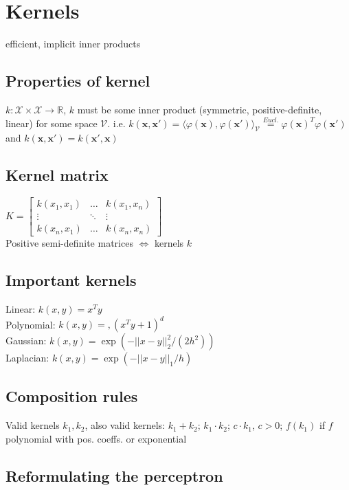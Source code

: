 \section*{Kernels}

efficient, implicit inner products

\subsection*{Properties of kernel}
$k: \mathcal{X} \times \mathcal{X} \rightarrow \mathbb{R}$, $k$ must be some inner product (symmetric, positive-definite, linear) for some space $\mathcal{V}$.
i.e. $k(\mathbf{x}, \mathbf{x'}) = \langle \varphi(\mathbf{x}), \varphi(\mathbf{x'}) \rangle_\mathcal{V} \overset{Eucl.}{=} \varphi(\mathbf{x})^T \varphi(\mathbf{x'}) $
and $k(\mathbf{x}, \mathbf{x}') = k(\mathbf{x}', \mathbf{x})$

\subsection*{Kernel matrix}
$K = 
\begin{bmatrix}
	k(x_1,x_1) & \dots & k(x_1,x_n) \\
	\vdots & \ddots & \vdots \\
	k(x_n, x_1) & \dots & k(x_n,x_n)
\end{bmatrix}$\\
Positive semi-definite matrices $\Leftrightarrow$ kernels $k$

\subsection*{Important kernels}
Linear: $k(x,y)=x^T y$\\
Polynomial: $k(x,y)=,{(x^T y + 1)}^d$\\
Gaussian: $k(x,y) = \exp(-||x-y||_2^2/(2h^2))$\\
Laplacian: $k(x,y) = \exp(-||x-y||_1/h)$

\subsection*{Composition rules}
Valid kernels $k_1, k_2$, also valid kernels:
$k_1 + k_2$; $k_1 \cdot k_2$; $c \cdot k_1$, $c>0$;
$f(k_1)$ if $f$ polynomial with pos. coeffs. or exponential

\subsection*{Reformulating the perceptron}

